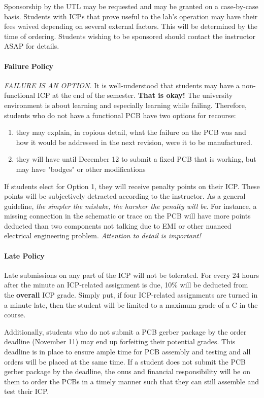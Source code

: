     Sponsorship by the UTL may be requested and may be granted on a case-by-case basis. Students with ICPs that prove useful to the lab's operation may have their fees waived depending on several external factors.
    This will be determined by the time of ordering.
    Students wishing to be sponsored should contact the instructor ASAP for details.

    \paragraph*{Failure Policy} \emph{FAILURE IS AN OPTION.} It is well-understood that students may have a non-functional ICP at the end of the semester. \textbf{That is okay!}
    The university environment is about learning and especially learning while failing.
    Therefore, students who do not have a functional PCB have two options for recourse:
    \begin{enumerate}
        \item they may explain, in copious detail, what the failure on the PCB was and how it would be addressed in the next revision, were it to be manufactured. 
        \item they will have until December 12 to submit a fixed PCB that is working, but may have "bodges" or other modifications
    \end{enumerate}
    If students elect for Option 1, they will receive penalty points on their ICP. These points will be subjectively detracted according to the instructor. As a general guideline, \emph{the simpler the mistake, the harsher the penalty will be}. 
    For instance, a missing connection in the schematic or trace on the PCB will have more points deducted than two components not talking due to EMI or other nuanced electrical engineering problem.
    \emph{Attention to detail is important!}

    \paragraph*{Late Policy} Late submissions on any part of the ICP will not be tolerated. For every 24 hours after the minute an ICP-related assignment is due, 10\% will be deducted from the \textbf{overall} ICP grade.
    Simply put, if four ICP-related assignments are turned in a minute late, then the student will be limited to a maximum grade of a C in the course.
    
    Additionally, students who do not submit a PCB gerber package by the order deadline (November 11) may end up forfeiting their potential grades.
    This deadline is in place to ensure ample time for PCB assembly and testing and all orders will be placed at the same time.
    If a student does not submit the PCB gerber package by the deadline, the onus and financial responsibility will be on them to order the PCBs in a timely manner such that they can still assemble and test their ICP.

